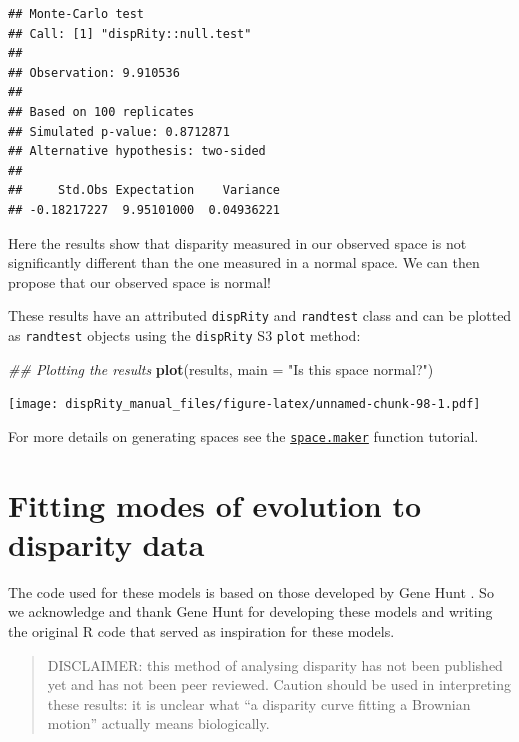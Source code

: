 \documentclass[
]{book}
\newenvironment{Shaded}{\begin{snugshade}}{\end{snugshade}}
\newcommand{\CommentTok}[1]{\textcolor[rgb]{0.56,0.35,0.01}{\textit{#1}}}
\newcommand{\DataTypeTok}[1]{\textcolor[rgb]{0.13,0.29,0.53}{#1}}
\newcommand{\KeywordTok}[1]{\textcolor[rgb]{0.13,0.29,0.53}{\textbf{#1}}}
\newcommand{\NormalTok}[1]{#1}
\newcommand{\StringTok}[1]{\textcolor[rgb]{0.31,0.60,0.02}{#1}}
\begin{document}
\begin{verbatim}
## Monte-Carlo test
## Call: [1] "dispRity::null.test"
## 
## Observation: 9.910536 
## 
## Based on 100 replicates
## Simulated p-value: 0.8712871 
## Alternative hypothesis: two-sided 
## 
##     Std.Obs Expectation    Variance 
## -0.18217227  9.95101000  0.04936221
\end{verbatim}

Here the results show that disparity measured in our observed space is not significantly different than the one measured in a normal space.
We can then propose that our observed space is normal!

These results have an attributed \texttt{dispRity} and \texttt{randtest} class and can be plotted as \texttt{randtest} objects using the \texttt{dispRity} S3 \texttt{plot} method:

\begin{Shaded}
\begin{Highlighting}[]
\CommentTok{\#\# Plotting the results}
\KeywordTok{plot}\NormalTok{(results, }\DataTypeTok{main =} \StringTok{"Is this space normal?"}\NormalTok{)}
\end{Highlighting}
\end{Shaded}

\texttt{[image: dispRity\_manual\_files/figure-latex/unnamed-chunk-98-1.pdf]}

For more details on generating spaces see the \protect\hyperlink{Simulating-multidimensional-spaces}{\texttt{space.maker}} function tutorial.

\hypertarget{model-fitting}{%
\section{Fitting modes of evolution to disparity data}\label{model-fitting}}

The code used for these models is based on those developed by Gene Hunt \citep{hunt2006fitting, hunt2012measuring, hunt2015simple}.
So we acknowledge and thank Gene Hunt for developing these models and writing the original R code that served as inspiration for these models.

\begin{quote}
DISCLAIMER: this method of analysing disparity has not been published yet and has not been peer reviewed. Caution should be used in interpreting these results: it is unclear what ``a disparity curve fitting a Brownian motion'' actually means biologically.
\end{quote}
\end{document}
